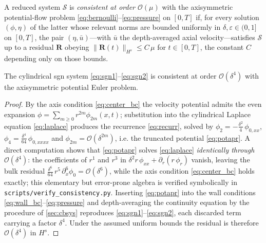 \documentclass[alpha-refs, 12pt]{wiley-article}
\renewcommand{\O}{\mathcal{O}}
\newcommand{\eps}{\varepsilon}
\begin{document}
\begin{definition}\label{def:consistency}
A reduced system $\mathcal{S}$ is \emph{consistent at order $\O(\mu)$} with the axisymmetric potential-flow problem \eqref{eq:bernoulli}--\eqref{eq:pressure} on $[0,T]$ if, for every solution $(\phi,\eta)$ of the latter whose relevant norms are bounded uniformly in $\delta,\eps\in(0,1]$ on $[0,T]$, the pair $(\eta,\bar{u})$---with $\bar{u}$ the depth-averaged axial velocity---satisfies $\mathcal{S}$ up to a residual $\mathbf{R}$ obeying $\|\mathbf{R}(t)\|_{H^{s}}\le C\,\mu$ for $t\in[0,T]$, the constant $C$ depending only on those bounds.
\end{definition}

\begin{theorem}\label{thm:consistency_sgn}
The cylindrical \acrshort{sgn} system \eqref{eq:sgn1}--\eqref{eq:sgn2} is consistent at order $\O(\delta^{4})$ with the axisymmetric potential Euler problem.
\end{theorem}
\begin{proof}
By the axis condition \eqref{eq:center_bc} the velocity potential admits the even expansion $\phi=\sum_{m\ge0}r^{2m}\phi_{2m}(x,t)$; substitution into the cylindrical Laplace equation \eqref{eq:laplace} produces the recurrence \eqref{eq:recurr}, solved by $\phi_{2}=-\tfrac{\delta^{2}}{4}\,\phi_{0,xx}$, $\phi_{4}=\tfrac{\delta^{4}}{64}\,\phi_{0,xxxx}$ and $\phi_{2m}=\O(\delta^{2m})$, i.e. the truncated potential \eqref{eq:potapr}. A direct computation shows that \eqref{eq:potapr} solves \eqref{eq:laplace} \emph{identically through} $\O(\delta^{4})$: the coefficients of $r^{1}$ and $r^{3}$ in $\delta^{2}r\,\phi_{xx}+\partial_{r}(r\,\phi_{r})$ vanish, leaving the bulk residual $\tfrac{\delta^{6}}{64}\,r^{5}\,\partial_{x}^{6}\phi_{0}=\O(\delta^{6})$, while the axis condition \eqref{eq:center_bc} holds exactly; this elementary but error-prone algebra is verified symbolically in \texttt{scripts/verify\_consistency.py}. Inserting \eqref{eq:potapr} into the wall conditions \eqref{eq:wall_bc}--\eqref{eq:pressure} and depth-averaging the continuity equation by the procedure of \cref{sec:cbsys} reproduces \eqref{eq:sgn1}--\eqref{eq:sgn2}, each discarded term carrying a factor $\delta^{4}$. Under the assumed uniform bounds the residual is therefore $\O(\delta^{4})$ in $H^{s}$.
\end{proof}
\end{document}

